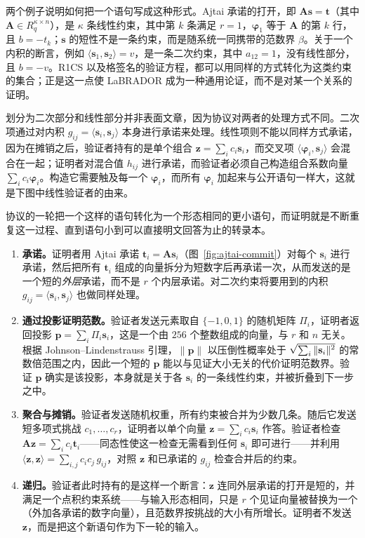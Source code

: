 两个例子说明如何把一个语句写成这种形式。Ajtai 承诺的打开，即 $\mathbf{A}\mathbf{s}=\mathbf{t}$（其中 $\mathbf{A}\in R_q^{\kappa\times n}$），是 $\kappa$ 条线性约束，其中第 $k$ 条满足 $r=1$，$\boldsymbol{\varphi}_1$ 等于 $\mathbf{A}$ 的第 $k$ 行，且 $b=-t_k$；$\mathbf{s}$ 的短性不是一条约束，而是随系统一同携带的范数界 $\beta$。关于一个内积的断言，例如 $\langle\mathbf{s}_1,\mathbf{s}_2\rangle=v$，是一条二次约束，其中 $a_{12}=1$，没有线性部分，且 $b=-v$。R1CS 以及格签名的验证方程，都可以用同样的方式转化为这类约束的集合；正是这一点使 LaBRADOR 成为一种通用论证，而不是对某一个关系的证明。

划分为二次部分和线性部分并非表面文章，因为协议对两者的处理方式不同。二次项通过对内积 $g_{ij}=\langle\mathbf{s}_i,\mathbf{s}_j\rangle$ 本身进行承诺来处理。线性项则不能以同样方式承诺，因为在摊销之后，验证者持有的是单个组合 $\mathbf{z}=\sum_ic_i\mathbf{s}_i$，而交叉项 $\langle\boldsymbol{\varphi}_i,\mathbf{s}_j\rangle$ 会混合在一起；证明者对混合值 $h_{ij}$ 进行承诺，而验证者必须自己构造组合系数向量 $\sum_ic_i\boldsymbol{\varphi}_i$。构造它需要触及每一个 $\boldsymbol{\varphi}_i$，而所有 $\boldsymbol{\varphi}_i$ 加起来与公开语句一样大，这就是下图中线性验证者的由来。

协议的一轮把一个这样的语句转化为一个形态相同的更小语句，而证明就是不断重复这一过程、直到语句小到可以直接明文回答为止的转录本。

\begin{enumerate}
  \item \textbf{承诺。}证明者用 Ajtai 承诺 $\mathbf{t}_i=\mathbf{A}\mathbf{s}_i$（图~\ref{fig:ajtai-commit}）对每个 $\mathbf{s}_i$ 进行承诺，然后把所有 $\mathbf{t}_i$ 组成的向量拆分为短数字后再承诺一次，从而发送的是一个短的\emph{外层}承诺，而不是 $r$ 个内层承诺。对二次约束将要用到的内积 $g_{ij}=\langle\mathbf{s}_i,\mathbf{s}_j\rangle$ 也做同样处理。
  \item \textbf{通过投影证明范数。}验证者发送元素取自 $\{-1,0,1\}$ 的随机矩阵 $\Pi_i$，证明者返回投影 $\mathbf{p}=\sum_i\Pi_i\mathbf{s}_i$，这是一个由 $256$ 个整数组成的向量，与 $r$ 和 $n$ 无关。根据 Johnson--Lindenstrauss 引理，$\|\mathbf{p}\|$ 以压倒性概率处于 $\sqrt{\smash[b]{\textstyle\sum_i\|\mathbf{s}_i\|^2}}$ 的常数倍范围之内，因此一个短的 $\mathbf{p}$ 能以与见证大小无关的代价证明范数界。验证 $\mathbf{p}$ 确实是该投影，本身就是关于各 $\mathbf{s}_i$ 的一条线性约束，并被折叠到下一步之中。
  \item \textbf{聚合与摊销。}验证者发送随机权重，所有约束被合并为少数几条。随后它发送短多项式挑战 $c_1,\dots,c_r$，证明者以单个向量 $\mathbf{z}=\sum_i c_i\mathbf{s}_i$ 作答。验证者检查 $\mathbf{A}\mathbf{z}=\sum_i c_i\mathbf{t}_i$——同态性使这一检查无需看到任何 $\mathbf{s}_i$ 即可进行——并利用 $\langle\mathbf{z},\mathbf{z}\rangle=\sum_{i,j}c_ic_j\,g_{ij}$，对照 $\mathbf{z}$ 和已承诺的 $g_{ij}$ 检查合并后的约束。
  \item \textbf{递归。}验证者此时持有的是这样一个断言：$\mathbf{z}$ 连同外层承诺的打开是短的，并满足一个点积约束系统——与输入形态相同，只是 $r$ 个见证向量被替换为一个（外加各承诺的数字向量），且范数界按挑战的大小有所增长。证明者不发送 $\mathbf{z}$，而是把这个新语句作为下一轮的输入。
\end{enumerate}

